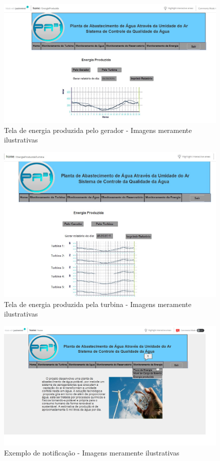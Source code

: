 \begin{center}
\begin{figure}[!ht]
\centering
\includegraphics[scale=0.5]{figuras/16}
\caption[Tela de energia produzida pelo gerador]{Tela de energia produzida pelo gerador - Imagens meramente ilustrativas}
\label{tela_energia_produzida}
\end{figure}


\begin{figure}[!ht]
\centering
\includegraphics[scale=0.5]{figuras/17}
\caption[Tela de energia produzida pela turbina]{Tela de energia produzida pela turbina - Imagens meramente ilustrativas}
\label{tela_energia_produzida_turbina}
\end{figure}
\clearpage

\begin{figure}[!ht]
\centering
\includegraphics[scale=0.3]{figuras/exemplo_notificacao}
\caption[Exemplo de notificação]{Exemplo de notificação - Imagens meramente ilustrativas}
\label{tela_notificacao}
\end{figure}


\end{center}
